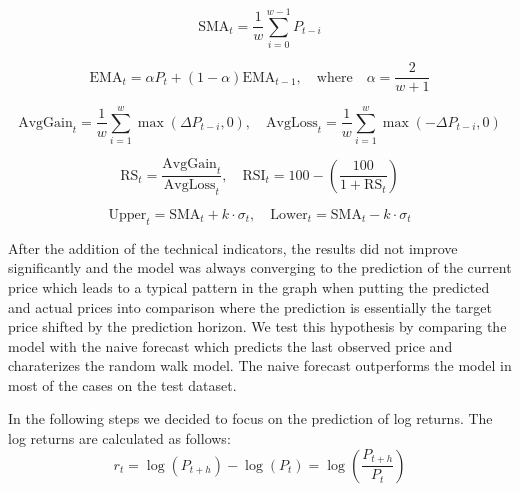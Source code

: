 \newpage
\begin{equation}\label{eq:sma}
    \text{SMA}_t = \frac{1}{w} \sum_{i=0}^{w-1} P_{t-i}
\end{equation}

\begin{equation}\label{eq:ema}
    \text{EMA}_t = \alpha P_t + (1 - \alpha) \text{EMA}_{t-1}, \quad \text{where} \quad \alpha = \frac{2}{w + 1}
\end{equation}

\begin{equation}\label{eq:rsi_avg}
    \text{AvgGain}_t = \frac{1}{w} \sum_{i=1}^{w} \max(\Delta P_{t-i}, 0), \quad
    \text{AvgLoss}_t = \frac{1}{w} \sum_{i=1}^{w} \max(-\Delta P_{t-i}, 0)
\end{equation}

\begin{equation}\label{eq:rsi}
    \text{RS}_t = \frac{\text{AvgGain}_t}{\text{AvgLoss}_t}, \quad
    \text{RSI}_t = 100 - \left( \frac{100}{1 + \text{RS}_t} \right)
\end{equation}

\begin{equation}\label{eq:bbands}
    \text{Upper}_t = \text{SMA}_t + k \cdot \sigma_t, \quad
    \text{Lower}_t = \text{SMA}_t - k \cdot \sigma_t
\end{equation}

After the addition of the technical indicators, the results
did not improve significantly and the model 
was always converging to the prediction of the current price
which leads to a typical pattern in the 
graph when putting the predicted and actual prices into comparison 
where the prediction is essentially
the target price shifted by the prediction horizon.
We test this hypothesis by comparing
the model with the naive forecast which predicts the last
observed price and charaterizes
the random walk model. The naive forecast outperforms 
the model in most of the cases on the test dataset. 


In the following steps we decided to focus on the prediction
of log returns. The log returns are calculated as follows:
\begin{equation}\label{eq:log_returns}
    r_t = \log(P_{t+h}) - \log(P_t) = \log\left(\frac{P_{t+h}}{P_t}\right)
\end{equation}

